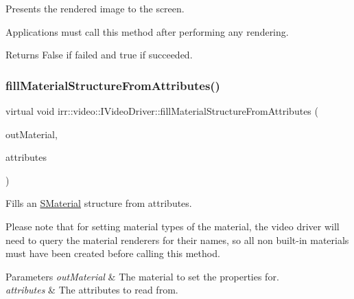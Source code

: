 Presents the rendered image to the screen. 

Applications must call this method after performing any rendering. \begin{DoxyReturn}{Returns}
False if failed and true if succeeded. 
\end{DoxyReturn}
\mbox{\label{classirr_1_1video_1_1IVideoDriver_a9b7b5942cf2378f9f96d47ec7a0cd881}} 
\subsubsection{\texorpdfstring{fill\+Material\+Structure\+From\+Attributes()}{fillMaterialStructureFromAttributes()}}
{\footnotesize\ttfamily virtual void irr\+::video\+::\+I\+Video\+Driver\+::fill\+Material\+Structure\+From\+Attributes (\begin{DoxyParamCaption}\item[{\hyperlink{classirr_1_1video_1_1SMaterial}{video\+::\+S\+Material} \&}]{out\+Material,  }\item[{\hyperlink{classirr_1_1io_1_1IAttributes}{io\+::\+I\+Attributes} $\ast$}]{attributes }\end{DoxyParamCaption})\hspace{0.3cm}{\ttfamily [pure virtual]}}



Fills an \hyperlink{classirr_1_1video_1_1SMaterial}{S\+Material} structure from attributes. 

Please note that for setting material types of the material, the video driver will need to query the material renderers for their names, so all non built-\/in materials must have been created before calling this method. 
\begin{DoxyParams}{Parameters}
{\em out\+Material} & The material to set the properties for. \\
\hline
{\em attributes} & The attributes to read from. \\
\hline
\end{DoxyParams}
\mbox{\label{classirr_1_1video_1_1IVideoDriver_ad4eaed6d56b092e6805400ca59795de9}} 
